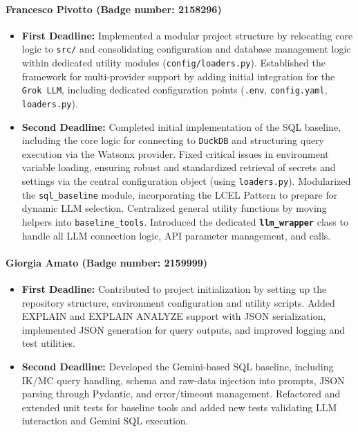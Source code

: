 \paragraph{\textbf{Francesco Pivotto (Badge number: 2158296)}}
\begin{itemize}[leftmargin=*]
    \item \textbf{First Deadline:} Implemented a modular project structure by relocating core logic to \texttt{src/} and consolidating configuration and database management logic within dedicated utility modules (\texttt{config/loaders.py}). 
    Established the framework for multi-provider support by adding initial integration for the \texttt{Grok LLM}, including dedicated configuration points (\texttt{.env}, \texttt{config.yaml}, \texttt{loaders.py}).
    
    \item \textbf{Second Deadline:} Completed initial implementation of the SQL baseline, including the core logic for connecting to \texttt{DuckDB} and structuring query execution via the Watsonx provider.
    Fixed critical issues in environment variable loading, ensuring robust and standardized retrieval of secrets and settings via the central configuration object (using \texttt{loaders.py}).
    Modularized the \texttt{sql\_baseline} module, incorporating the LCEL Pattern to prepare for dynamic LLM selection.
    Centralized general utility functions by moving helpers into \texttt{baseline\_tools}.
    Introduced the dedicated \textbf{\texttt{llm\_wrapper}} class to handle all LLM connection logic, API parameter management, and calls.
\end{itemize}

\paragraph{\textbf{Giorgia Amato (Badge number: 2159999)}}
\begin{itemize}[leftmargin=*]
    \item \textbf{First Deadline:} Contributed to project initialization by setting up the repository structure, environment configuration and utility scripts. 
    Added EXPLAIN and EXPLAIN ANALYZE support with JSON serialization, implemented JSON generation for query outputs, and improved logging and test utilities.
     \item \textbf{Second Deadline:} Developed the Gemini-based SQL baseline, including IK/MC query handling, schema and raw-data injection into prompts, JSON parsing through Pydantic, and error/timeout management. 
     Refactored and extended unit tests for baseline tools and added new tests validating LLM interaction and Gemini SQL execution.
\end{itemize}